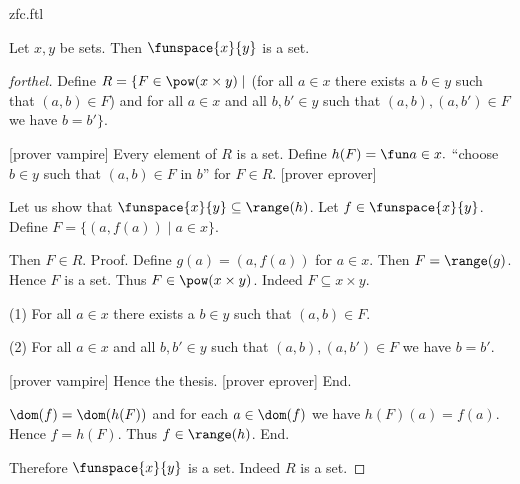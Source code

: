 \documentclass{naproche-library}
\begin{document}
\begin{smodule}[title=ZFC]{zfc.ftl}
\begin{proposition}[forthel,id=FOUNDATIONS_10_4105036244189184]
  Let $x, y$ be sets.
  Then $\funspace{x}{y}$ is a set.
\end{proposition}
\begin{proof}[forthel]
  Define $R = \{ F \in \pow(x \times y) \mid$ (for all $a \in x$ there exists a $b \in y$ such that $(a,b) \in F$) and for all $a \in x$ and all $b, b' \in y$ such that $(a,b), (a,b') \in F$ we have $b = b' \}$.

  [prover vampire]
  Every element of $R$ is a set. %
  Define $h(F) = \fun a \in x.$ ``choose $b \in y$ such that $(a,b) \in F$ in $b$'' for $F \in R$.
  [prover eprover]

  Let us show that $\funspace{x}{y} \subseteq \range(h)$.
    Let $f \in \funspace{x}{y}$.
    Define $F = \{ (a,f(a)) \mid a \in x \}$.

    Then $F \in R$. \newline
    Proof.
      Define $g(a) = (a,f(a))$ for $a \in x$.
      Then $F = \range(g)$.
      Hence $F$ is a set.
      Thus $F \in \pow(x \times y)$.
      Indeed $F \subseteq x \times y$.

      (1) For all $a \in x$ there exists a $b \in y$ such that $(a,b) \in F$.

      (2) For all $a \in x$ and all $b, b' \in y$ such that $(a,b),
      (a,b') \in F$ we have $b = b'$.

      [prover vampire]
      Hence the thesis.
      [prover eprover]
    End.

    $\dom(f) = \dom(h(F))$ and for each $a \in \dom(f)$ we have $h(F)(a) = f(a)$.
    Hence $f = h(F)$.
    Thus $f \in \range(h)$.
  End.

  Therefore $\funspace{x}{y}$ is a set.
  Indeed $R$ is a set.
\end{proof}
\end{smodule}
\end{document}
